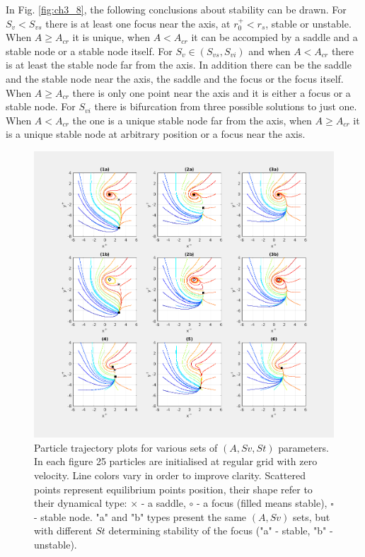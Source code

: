 \documentclass[../main.tex]{subfiles}
\begin{document}
In Fig. \ref{fig:ch3_8}, the following conclusions about stability can be drawn.  For $S_v<S_{v s}$ there is at least one focus near the axis, at $r^+_0<r_s$, stable or unstable. When $A \geq A_{cr}$ it is unique, when $A<A_{cr}$ it can be accompied by a saddle and a stable node or a stable node itself. For $S_v \in (S_{v s},S_{v i})$ and when $A<A_{cr}$ there is at least the stable node far from the axis. In addition there can be the saddle and the stable node near the axis, the saddle and the focus or the focus itself. When $A \geq A_{cr}$ there is only one point near the axis and it is either a focus or a stable node. For $S_{v i}$ there is bifurcation from three possible solutions to just one. When $A<A_{cr}$ the one is a unique stable node far from the axis, when $A \geq A_{cr}$ it is a unique stable node at arbitrary position or a focus near the axis.\\

\begin{figure}
\centering
\noindent \includegraphics[width=30pc]{gfx/scenarios_9p_T500_D5_N5.png}
\caption{Particle trajectory plots for various sets of $(A,Sv,St)$ parameters. In each figure 25 particles are initialised at regular grid with zero velocity. Line colors vary in order to improve clarity. Scattered points represent equilibrium points position, their shape refer to their dynamical type: $\times$ - a saddle, $\circ$ - a focus (filled means stable), $\square$ - stable node. "a" and "b" types present the same $(A,Sv)$ sets, but with different $St$ determining stability of the focus ("a" - stable, "b" - unstable).}
\label{fig:ch3_9}
\end{figure}
\end{document}
